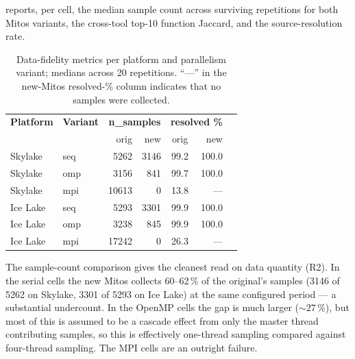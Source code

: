  reports, per cell, the median sample count across surviving repetitions for both Mitos variants, the cross-tool top-10 function Jaccard, and the source-resolution rate.

\begin{table}[h]
    \centering
    \small
    \begin{tabular}{@{}llrrcrr@{}}
        \textbf{Platform} & \textbf{Variant} & \multicolumn{2}{c}{\textbf{n\_samples}} & \multicolumn{2}{c}{\textbf{resolved \%}}                \\
                          &                  & orig                                    & new                                      & orig & new   \\
        \hline
        Skylake           & seq              & 5262                                    & 3146                                     & 99.2 & 100.0 \\
        Skylake           & omp              & 3156                                    & 841                                      & 99.7 & 100.0 \\
        Skylake           & mpi              & 10613                                   & 0                                        & 13.8 & ---   \\
        Ice Lake          & seq              & 5293                                    & 3301                                     & 99.9 & 100.0 \\
        Ice Lake          & omp              & 3238                                    & 845                                      & 99.9 & 100.0 \\
        Ice Lake          & mpi              & 17242                                   & 0                                        & 26.3 & ---   \\
    \end{tabular}
    \caption{Data-fidelity metrics per platform and parallelism variant; medians across 20 repetitions. ``---'' in the new-Mitos resolved-\% column indicates that no samples were collected.}
    \label{tab:eval-fidelity}
\end{table}

The sample-count comparison gives the cleanest read on data quantity (R2). In the serial cells the new Mitos collects 60--62\,\% of the original's samples (3146 of 5262 on Skylake, 3301 of 5293 on Ice Lake) at the same configured period --- a substantial undercount. In the OpenMP cells the gap is much larger (${\sim}27\,\%$), but most of this is assumed to be a cascade effect from only the master thread contributing samples, so this is effectively one-thread sampling compared against four-thread sampling. The MPI cells are an outright failure.

